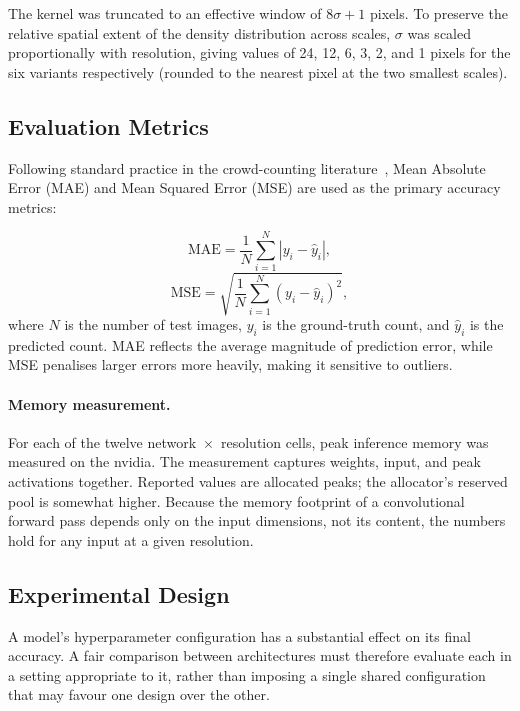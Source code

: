 \documentclass[conference]{IEEEtran}
\begin{document}
The kernel was truncated to an effective window of $8\sigma + 1$ pixels. To
preserve the relative spatial extent of the density distribution across scales,
$\sigma$ was scaled proportionally with resolution, giving values of 24, 12, 6,
3, 2, and 1 pixels for the six variants respectively (rounded to the nearest
pixel at the two smallest scales).

\subsection{Evaluation Metrics}
\label{sec:eval_metrics}
Following standard practice in the crowd-counting literature~\cite{gao2020crowdcountingsurvey}, Mean Absolute Error (MAE) and Mean Squared Error (MSE) are used as the primary accuracy metrics:

\begin{equation}
    \text{MAE} = \frac{1}{N} \sum_{i=1}^{N} \left| y_i - \hat{y}_i \right|,
\end{equation}
\begin{equation}
    \text{MSE} = \sqrt{\frac{1}{N} \sum_{i=1}^{N}
    \left( y_i - \hat{y}_i \right)^2},
\end{equation}
where $N$ is the number of test images, $y_i$ is the ground-truth count, and
$\hat{y}_i$ is the predicted count. MAE reflects the average magnitude of
prediction error, while MSE penalises larger errors more heavily, making it
sensitive to outliers.

\paragraph{Memory measurement.}
For each of the twelve network~$\times$~resolution cells, peak
inference memory was measured on the nvidia. The
measurement captures weights, input, and peak activations
together. Reported values are allocated peaks; the allocator's
reserved pool is somewhat higher. Because the memory footprint of a
convolutional forward pass depends only on the input dimensions, not
its content, the numbers hold for any input at a given resolution. %

\subsection{Experimental Design}
A model's hyperparameter configuration has a substantial effect on its final
accuracy. A fair comparison between architectures must therefore evaluate each in
a setting appropriate to it, rather than imposing a single shared configuration
that may favour one design over the other.
\end{document}
